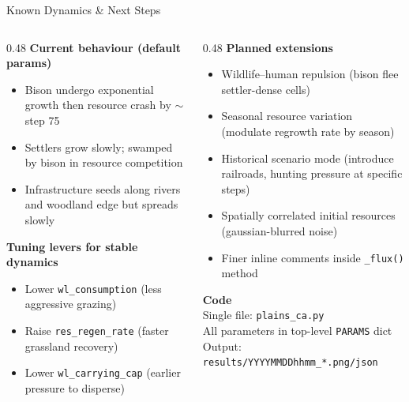 \documentclass[aspectratio=169]{beamer}
\begin{document}
\begin{frame}{Known Dynamics \& Next Steps}
  \begin{columns}[T]
    \begin{column}{0.48\textwidth}
      \textbf{Current behaviour (default params)}
      \begin{itemize}
        \item Bison undergo exponential growth then resource crash by $\sim$step 75
        \item Settlers grow slowly; swamped by bison in resource competition
        \item Infrastructure seeds along rivers and woodland edge but spreads slowly
      \end{itemize}

      \vspace{0.5em}
      \textbf{Tuning levers for stable dynamics}
      \begin{itemize}
        \item Lower \texttt{wl\_consumption} (less aggressive grazing)
        \item Raise \texttt{res\_regen\_rate} (faster grassland recovery)
        \item Lower \texttt{wl\_carrying\_cap} (earlier pressure to disperse)
      \end{itemize}
    \end{column}
    \begin{column}{0.48\textwidth}
      \textbf{Planned extensions}
      \begin{itemize}
        \item Wildlife--human repulsion (bison flee settler-dense cells)
        \item Seasonal resource variation (modulate regrowth rate by season)
        \item Historical scenario mode (introduce railroads, hunting pressure
              at specific steps)
        \item Spatially correlated initial resources (gaussian-blurred noise)
        \item Finer inline comments inside \texttt{\_flux()} method
      \end{itemize}

      \vspace{0.5em}
      \textbf{Code}\\
      \small
      Single file: \texttt{plains\_ca.py}\\
      All parameters in top-level \texttt{PARAMS} dict\\
      Output: \texttt{results/YYYYMMDDhhmm\_*.png/json}
    \end{column}
  \end{columns}
\end{frame}
\end{document}
